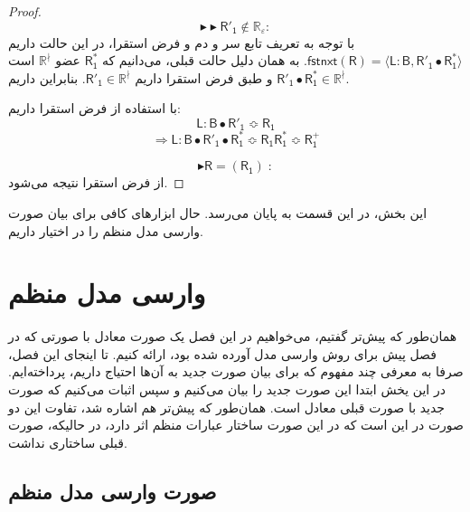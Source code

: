 \begin{proof}
	$$\blacktriangleright\blacktriangleright\mathsf{R'_1} \notin \mathbb{R_\varepsilon}:$$
با توجه به تعریف تابع سر و دم و فرض استقرا، در این حالت داریم 
	$\mathsf{fstnxt(R)=\langle L:B , R'_1 \bullet R_1^* \rangle}$.
	به همان دلیل حالت قبلی، می‌دانیم که $\mathsf{R_1^*}$ عضو $\mathbb{R^\nmid}$ است و طبق فرض استقرا داریم $\mathsf{R'_1} \in \mathbb{R^\nmid}$. بنابراین داریم
		$\mathsf{R'_1 \bullet R_1^*} \in \mathbb{R^\nmid}$.
		
		با استفاده از فرض استقرا داریم:
		$$\mathsf{L:B \bullet R'_1 \Bumpeq R_1}$$
		$$\Rightarrow \mathsf{L:B \bullet R'_1 \bullet R_1^* \Bumpeq R_1 R_1^* \Bumpeq R_1^+}$$
	
	$$\blacktriangleright\mathsf{R=(R_1)\;:}$$
	از فرض استقرا نتیجه می‌شود.
\end{proof}

این بخش، در این قسمت به پایان می‌رسد. حال ابزارهای کافی برای بیان صورت وارسی مدل منظم را در اختیار داریم.

\section{وارسی مدل منظم}
همان‌طور که پیش‌تر گفتیم، می‌خواهیم در این فصل یک صورت معادل با صورتی که در فصل پیش برای روش وارسی مدل آورده شده بود، ارائه کنیم. تا اینجای این فصل، صرفا به معرفی چند مفهوم که برای بیان  صورت جدید به آن‌ها احتیاج داریم، پرداخته‌ایم. در این یخش ابتدا این صورت جدید را بیان می‌‌کنیم و سپس اثبات می‌‌کنیم که صورت جدید با صورت قبلی معادل است. همان‌طور که پیش‌تر هم اشاره شد، تفاوت این دو صورت در این است که در این صورت ساختار عبارات منظم اثر دارد، در حالیکه، صورت قبلی ساختاری نداشت.
\subsection{صورت وارسی مدل منظم}

